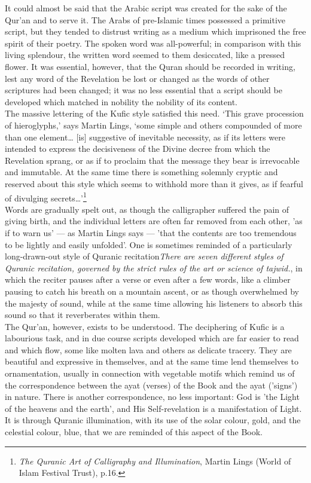 \documentclass[10pt, twoside,openright]{book}
\begin{document}
It could almost be said that the Arabic script was created for the sake of the Qur'an and to serve 
it. The Arabs of pre\hyp{}Islamic times possessed a primitive script, but they tended to distrust writing 
as a medium which imprisoned the free spirit of their poetry. The spoken word was all\hyp{}powerful; in 
comparison with this living splendour, the written word seemed to them desiccated, like a pressed 
flower. It was essential, however, that the Quran should be recorded in writing, lest any word of the 
Revelation be lost or changed as the words of other scriptures had been changed; it was no less 
essential that a script should be developed which matched in nobility the nobility of its content. \\

The massive lettering of the Kufic style satisfied this need. `This grave procession of hieroglyphs,' 
says Martin Lings, `some simple and others compounded of more than one element\ldots{} [is] suggestive 
of inevitable necessity, as if its letters were intended to express the decisiveness of the Divine 
decree from which the Revelation sprang, or as if to proclaim that the message they bear is 
irrevocable and immutable. At the same time there is something solemnly cryptic and reserved about 
this style which seems to withhold more than it gives, as if fearful of divulging secrets\ldots{}'\footnote{\emph{The Quranic Art of Calligraphy and Illumination}, Martin Lings (World of Islam Festival Trust), p.16.}\\

Words are gradually spelt out, as though the calligrapher suffered the pain of giving birth, and the 
individual letters are often far removed from each other, 'as if to warn us' --- as Martin Lings says --- 
'that the contents are too tremendous to be lightly and easily unfolded'. One is sometimes reminded 
of a particularly long\hyp{}drawn\hyp{}out style of Quranic recitation\emph{There are seven different styles of Quranic recitation, governed by the strict rules of the art or 
science of tajwid.}, in which the reciter pauses after a 
verse or even after a few words, like a climber pausing to catch his breath on a mountain ascent, or 
as though overwhelmed by the majesty of sound, while at the same time allowing his listeners to 
absorb this sound so that it reverberates within them.\\ 

The Qur'an, however, exists to be understood. The deciphering of Kufic is a labourious task, and in 
due course scripts developed which are far easier to read and which flow, some like molten lava and 
others as delicate tracery. They are beautiful and expressive in themselves, and at the same time 
lend themselves to ornamentation, usually in connection with vegetable motifs which remind us of the 
correspondence between the ayat (verses) of the Book and the ayat ('signs') in nature. There is 
another correspondence, no less important: God is 'the Light of the heavens and the earth', and His 
Self\hyp{}revelation is a manifestation of Light. It is through Quranic illumination, with its use of the 
solar colour, gold, and the celestial colour, blue, that we are reminded of this aspect of the Book. \\
\end{document}
